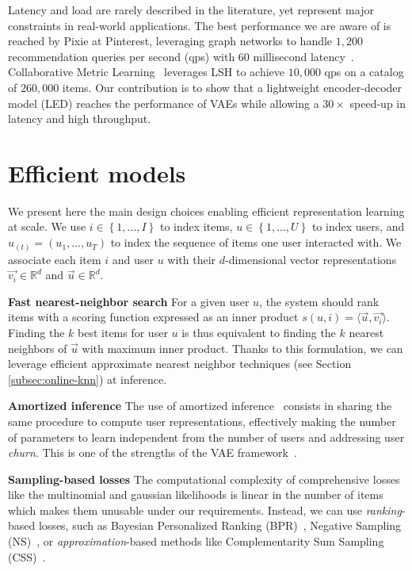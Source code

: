 \documentclass[sigconf]{acmart}
\begin{document}
Latency and load are rarely described in the literature, yet represent major constraints in real-world applications. The best performance we are aware of is reached by Pixie at Pinterest, leveraging graph networks to handle $1,200$ recommendation queries per second (qps) with 60 millisecond latency~\cite{pixie-pinterest-www-2018}. Collaborative Metric Learning~\cite{cml-www} leverages LSH to achieve $10,000$ qps on a catalog of $260,000 $ items. Our contribution is to show that a lightweight encoder-decoder model (LED) reaches the performance of VAEs while allowing a $30\times$ speed-up in latency and high throughput.



\section{Efficient models}
\label{sec:models}

We present here the main design choices enabling efficient representation learning at scale. We use $i \in \left\{ 1, ..., I \right\} $ to index items, $u \in \left\{ 1, ..., U \right\} $ to index users, and  $u_{(t)} = (u_1, ..., u_T) $ to index the sequence of items one user interacted with. We associate each item $ i $ and user $ u $ with their $ d $-dimensional vector representations $\overrightarrow{v_i} \in \mathbb{R}^d $ and $\overrightarrow{u} \in \mathbb{R}^d $.



\textbf{Fast nearest-neighbor search} For a given user $ u $, the system should rank items with a scoring function expressed as an inner product $ s(u, i) = \langle \vec{u}, \vec{v_i} \rangle $. Finding the $ k $ best items for user $ u $ is thus equivalent to finding the $ k $ nearest neighbors of $ \vec{u} $ with maximum inner product. Thanks to this formulation, we can leverage efficient approximate nearest neighbor techniques (see Section \ref{subsec:online-knn}) at inference.

\textbf{Amortized inference} The use of amortized inference~\cite{amortized-inference} consists in sharing the same procedure to compute user representations, effectively making the number of parameters to learn independent from the number of users and addressing user \emph{churn}. This is one of the strengths of the VAE framework~\cite{ract-cf}.

\textbf{Sampling-based losses} The computational complexity of comprehensive losses like the multinomial and gaussian likelihoods is linear in the number of items which makes them unusable under our requirements. Instead, we can use \emph{ranking}-based losses, such as Bayesian Personalized Ranking (BPR)~\cite{bpr}, Negative Sampling (NS)~\cite{NIPS2013_5021}, or \emph{approximation}-based methods like Complementarity Sum Sampling (CSS)~\cite{pmlr-v54-botev17a}. 
\end{document}

